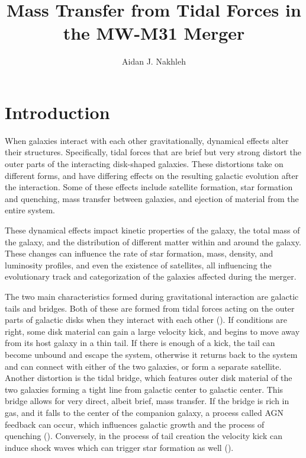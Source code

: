 \documentclass[linenumbers]{aastex631}
\begin{document}
\title{Mass Transfer from Tidal Forces in the MW-M31 Merger}


\author{Aidan J. Nakhleh}

\section{Introduction} \label{sec:intro}

When galaxies interact with each other gravitationally, dynamical effects alter their structures. Specifically, tidal forces that are brief but very strong distort the outer parts of the interacting disk-shaped galaxies. These distortions take on different forms, and have differing effects on the resulting galactic evolution after the interaction. Some of these effects include satellite formation, star formation and quenching, mass transfer between galaxies, and ejection of material from the entire system.

    These dynamical effects impact kinetic properties of the galaxy, the total mass of the galaxy, and the distribution of different matter within and around the galaxy. These changes can influence the rate of star formation, mass, density, and luminosity profiles, and even the existence of satellites, all influencing the evolutionary track and categorization of the galaxies affected during the merger. 

    The two main characteristics formed during gravitational interaction are galactic tails and bridges. Both of these are formed from tidal forces acting on the outer parts of galactic disks when they interact with each other (\cite{toomre1972galactic}). If conditions are right, some disk material can gain a large velocity kick, and begins to move away from its host galaxy in a thin tail. If there is enough of a kick, the tail can become unbound and escape the system, otherwise it returns back to the system and can connect with either of the two galaxies, or form a separate satellite. Another distortion is the tidal bridge, which features outer disk material of the two galaxies forming a tight line from galactic center to galactic center. This bridge allows for very direct, albeit brief, mass transfer. If the bridge is rich in gas, and it falls to the center of the companion galaxy, a process called AGN feedback can occur, which influences galactic growth and the process of quenching (\cite{ji2014lifetime}). Conversely, in the process of tail creation the velocity kick can induce shock waves which can trigger star formation as well (\cite{barnes2004shock}). 
\end{document}
